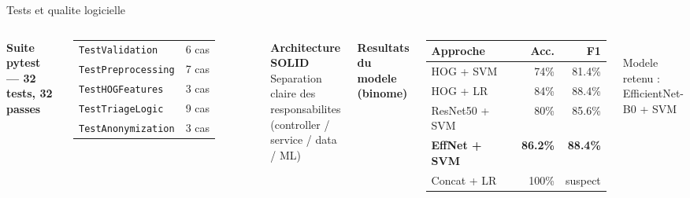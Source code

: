 \documentclass[aspectratio=169,11pt]{beamer}
\begin{document}
\begin{frame}{Tests et qualite logicielle}
\begin{columns}[T,onlytextwidth]
\textbf{Suite pytest --- 32 tests, 32 passes}\\[6pt]
\begin{tabular}{@{}l l@{}}
\texttt{TestValidation}    & 6 cas \\
\texttt{TestPreprocessing} & 7 cas \\
\texttt{TestHOGFeatures}   & 3 cas \\
\texttt{TestTriageLogic}   & 9 cas \\
\texttt{TestAnonymization} & 3 cas \\
\end{tabular}

\vspace{0.6em}
\textbf{Architecture SOLID}\\
Separation claire des responsabilites\\
(controller / service / data / ML)

\textbf{Resultats du modele (binome)}\\[4pt]
\begin{tabular}{@{}l r r@{}}
\toprule
\textbf{Approche} & \textbf{Acc.} & \textbf{F1} \\
\midrule
HOG + SVM          & 74\%  & 81.4\% \\
HOG + LR           & 84\%  & 88.4\% \\
ResNet50 + SVM     & 80\%  & 85.6\% \\
\textbf{EffNet + SVM} & \textbf{86.2\%} & \textbf{88.4\%} \\
Concat + LR        & 100\% & suspect \\
\bottomrule
\end{tabular}
\vspace{0.3em}\\
\textcolor{muted}{\scriptsize Modele retenu : EfficientNet-B0 + SVM}
\end{columns}
\end{frame}
\end{document}

